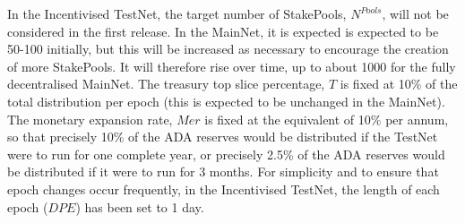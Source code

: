\documentclass[11pt,a4paper,dvipsnames,twosided,final]{article}
\newcommand{\ada}{ADA{}}
\newcommand{\ADA}[1]{\textbf{\emph{\ada~{#1}}}}
\begin{document}
\noindent
In the Incentivised TestNet,
the target number of StakePools, $N^{\textit{Pools}}$, will not be considered in the first release.
In the MainNet, it is expected is expected to be 50-100 initially, but this will be increased as necessary to encourage the creation of more StakePools.
It will therefore rise over time, up to about 1000 for the fully decentralised MainNet.
The treasury top slice percentage, $T$ is fixed at 10\% of the total distribution per epoch (this is expected to be unchanged in the MainNet).
The monetary expansion rate, $\textit{Mer}$ is fixed at the equivalent of 10\% per annum, so that precisely 10\% of the \ada{} reserves would be distributed
if the TestNet were to run for one complete year, or precisely 2.5\% of the \ada{} reserves would be distributed if it were to run for 3 months.
For simplicity and to ensure that epoch changes occur frequently, in the Incentivised TestNet, the length of each epoch ($\textit{DPE}$) has been set to 1 day.


\end{document}

